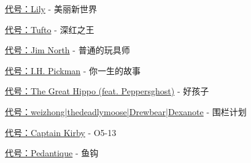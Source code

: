\begin{scpboxbrc}[colback=fcfdfb]
\hyperref[chap:SCP-001.the.worlds.gone.beautiful]{代号：Lily} - 美丽新世界

\hyperref[chap:SCP-001.the.scarlet.king]{代号：Tufto} - 深红之王

\hyperref[chap:SCP-001.a.simple.toymaker]{代号：Jim North} - 普通的玩具师

\hyperref[chap:SCP-001.story.of.your.life]{代号：I.H. Pickman} - 你一生的故事

\hyperref[chap:SCP-001.a.good.boy]{代号：The Great Hippo (feat. Peppersghost)} - 好孩子

\hyperref[chap:SCP-001.project.palisade]{代号：weizhong|thedeadlymoose|Drewbear|Dexanote} - 围栏计划

\hyperref[chap:SCP-001.O5.13]{代号：Captain Kirby} - O5-13

\hyperref[chap:SCP-001.fish.hook]{代号：Pedantique} - 鱼钩

\end{scpboxbrc}
